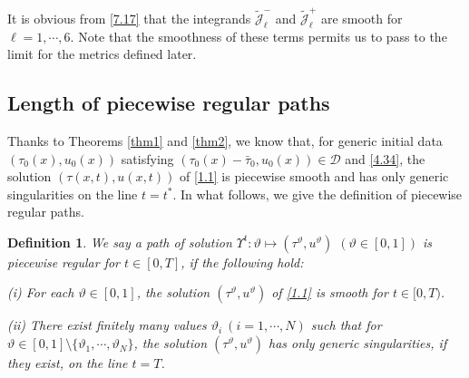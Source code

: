 \documentclass[11pt,reqno]{article}
\newtheorem{defn}{Definition}
\numberwithin{equation}{section}
\begin{document}
It is obvious from \eqref{7.17} that the integrands $\widetilde{\mathcal{J}}_{\ell}^-$ and $\widetilde{\mathcal{J}}_{\ell}^+$ are smooth for $\ell=1,\cdots,6$. Note that the smoothness of these terms permits us to pass to the limit for the metrics defined later.







\subsection{Length of piecewise regular paths}\label{S72}

Thanks to Theorems \ref{thm1} and \ref{thm2}, we know that, for generic initial data $(\tau_0(x), u_0(x))$ satisfying $(\tau_0(x)-\bar{\tau}_0, u_0(x))\in \mathcal{D}$ and \eqref{4.34}, the solution $(\tau(x,t), u(x,t))$ of \eqref{1.1} is piecewise smooth and has only generic singularities on the line $t=t^*$. In what follows, we give the definition of piecewise regular paths.

\begin{defn}\label{def2}
We say a path of solution $\Upsilon^t: \vartheta\mapsto (\tau^\vartheta, u^\vartheta)$ $(\vartheta\in[0,1])$ is piecewise regular for $t\in[0,T]$, if the following hold:

{\rm (i)} For each $\vartheta\in[0,1]$, the solution $(\tau^\vartheta, u^\vartheta)$ of \eqref{1.1} is smooth for $t\in[0,T)$.


{\rm (ii)} There exist finitely many values $\vartheta_i\ (i=1,\cdots, N)$ such that for $\vartheta\in[0,1]\setminus\{\vartheta_1,\cdots, \vartheta_N\}$, the solution $(\tau^\vartheta, u^\vartheta)$ has only generic singularities, if they exist, on the line $t=T$.
\end{defn}
\end{document}
